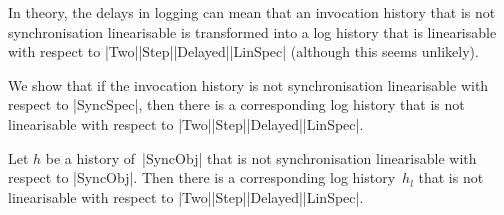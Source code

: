 
In theory, the delays in logging can mean that an invocation history that is
not synchronisation linearisable is transformed into a log history that is
linearisable with respect to |Two|\-|Step|\-|Delayed|\-|LinSpec| (although
this seems unlikely).  

We show that if the invocation history is not synchronisation linearisable
with respect to |SyncSpec|,
then there is a corresponding log history that is not linearisable with
respect to |Two|\-|Step|\-|Delayed|\-|LinSpec|.

\begin{prop}
\label{prop:TwoStepDelayedLinSpec-complete}
Let $h$ be a history of~|SyncObj| that is not synchronisation linearisable
with respect to |SyncObj|.  Then there is a corresponding log history~$h_l$
that is not linearisable with respect to |Two|\-|Step|\-|Delayed|\-|LinSpec|.
\end{prop}


